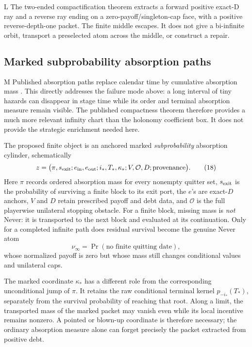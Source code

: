 \documentclass[11pt]{article}
\newcommand{\LTag}{\textsf{L}}
\newcommand{\MTag}{\textsf{M}}
\newcommand{\Prod}{\LTag}
\newcommand{\Audit}{\MTag}
\newcommand{\Status}[1]{#1}
\begin{document}
\Status{\Prod} The two-ended compactification theorem extracts a forward positive
exact-D ray and a reverse ray ending on a zero-payoff/singleton-cap face, with
a positive reverse-depth-one packet.  The finite middle escapes.  It does not
give a bi-infinite orbit, transport a preselected atom across the middle, or
construct a repair.

\subsection{Marked subprobability absorption paths}

\Status{\Audit} Published absorption paths replace calendar time by cumulative
absorption mass \cite{AshkenaziGolanEtAl2024}.  This directly addresses the
failure mode above: a long interval of tiny hazards can disappear in stage
time while its order and terminal absorption measure remain visible.  The
published compactness theorem therefore provides a much more relevant infinity
chart than the holonomy coefficient box.  It does not provide the strategic
enrichment needed here.

The proposed finite object is an anchored marked \emph{subprobability}
absorption cylinder, schematically
\[
 z=\bigl(\pi,s_{\rm exit};e_{\rm in},e_{\rm out};
          i_*,T_*,\kappa_*;V,\mathcal O,D;\text{provenance}\bigr).
\tag{18}
\]
Here $\pi$ records ordered absorption mass for every nonempty quitter set,
$s_{\rm exit}$ is the probability of surviving a finite block to its exit
port, the $e$'s are exact-$D$ anchors, $V$ and $D$ retain prescribed
payoff and debt data, and $\mathcal O$ is the full playerwise unilateral
stopping obstacle.  For a finite block, missing mass is \emph{not} Never: it
is transported to the next block and evaluated at its continuation.  Only for
a completed infinite path does residual survival become the genuine Never
atom
\[
 \nu_\infty=\Pr(\text{no finite quitting date}),
\tag{19}
\]
whose normalized payoff is zero but whose mass still changes conditional
values and unilateral caps.

The marked coordinate $\kappa_*$ has a different role from the corresponding
unconditional jump of $\pi$.  It retains the raw conditional terminal kernel
$p_{-i_*}(T_*)$, separately from the survival probability of reaching that
root.  Along a limit, the transported mass of the marked packet may vanish
even while its local incentive remains nonzero.  A pointed or blown-up
coordinate is therefore necessary; the ordinary absorption measure alone can
forget precisely the packet extracted from positive debt.
\end{document}
